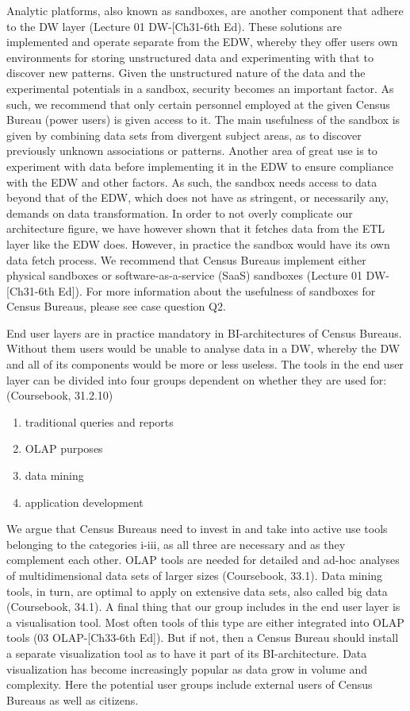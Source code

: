 Analytic platforms, also known as sandboxes, 
are another component that adhere to the DW layer (Lecture 01 DW-[Ch31-6th Ed). 
These solutions are implemented and operate separate from the EDW, 
whereby they offer users own environments for storing unstructured data and 
experimenting with that to discover new patterns. 
Given the unstructured nature of the data and the experimental potentials in a sandbox, 
security becomes an important factor. 
As such, we recommend that only certain personnel employed at the given Census Bureau (power users) 
is given access to it.  
The main usefulness of the sandbox is given by combining data sets from divergent subject areas, 
as to discover previously unknown associations or patterns. 
Another area of great use is to experiment with data before implementing it in the EDW 
to ensure compliance with the EDW and other factors. 
As such, the sandbox needs access to data beyond that of the EDW, 
which does not have as stringent, or necessarily any, demands on data transformation. 
In order to not overly complicate our architecture figure, 
we have however shown that it fetches data from the ETL layer like the EDW does. 
However, in practice the sandbox would have its own data fetch process. 
We recommend that Census Bureaus implement either physical sandboxes or 
software-as-a-service (SaaS) sandboxes (Lecture 01 DW-[Ch31-6th Ed]). 
For more information about the usefulness of sandboxes for Census Bureaus, please see case question Q2.  

 

End user layers are in practice mandatory in BI-architectures of Census Bureaus. 
Without them users would be unable to analyse data in a DW, 
whereby the DW and all of its components would be more or less useless. 
The tools in the end user layer can be divided into four groups dependent on whether they are used for:(Coursebook, 31.2.10)
\begin{enumerate}[label=\roman*)]
  \item traditional queries and reports
  \item OLAP purposes
  \item data mining
  \item application development
\end{enumerate}

We argue that Census Bureaus need to invest in and take into active use tools belonging to the categories i-iii, 
as all three are necessary and as they complement each other. 
OLAP tools are needed for detailed and ad-hoc analyses of 
multidimensional data sets of larger sizes (Coursebook, 33.1). 
Data mining tools, in turn, are optimal to apply on extensive data sets, 
also called big data (Coursebook, 34.1).  
A final thing that our group includes in the end user layer is a visualisation tool. 
Most often tools of this type are either integrated into OLAP tools (03 OLAP-[Ch33-6th Ed]). 
But if not, then a Census Bureau should install a separate visualization tool as to 
have it part of its BI-architecture. 
Data visualization has become increasingly popular as data grow in volume and complexity. 
Here the potential user groups include external users of Census Bureaus as well as citizens.  